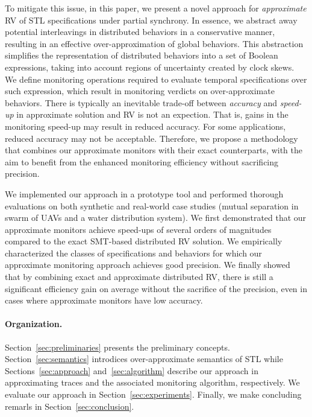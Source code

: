 To mitigate this issue, in this paper, we present a novel approach for \emph{approximate} RV of STL 
specifications under partial synchrony.
%
In essence, we abstract away potential interleavings in distributed behaviors in a conservative 
manner, resulting in an effective over-approximation of global behaviors.
%
This abstraction simplifies the representation of distributed behaviors into a set of Boolean 
expressions, taking into account regions of uncertainty created by clock skews.
%
We define monitoring operations required to evaluate temporal specifications over such expression, 
which result in monitoring verdicts on over-approximate behaviors.
%
There is typically an inevitable trade-off between {\em accuracy} and {\em speed-up} in approximate 
solution and  RV is not an expection.
%
That is, gains in the monitoring speed-up may result in reduced accuracy.
%
For some applications, reduced accuracy may not be acceptable.
%
Therefore, we propose a methodology that combines our approximate monitors with their exact 
counterparts, with the aim to benefit from the enhanced monitoring efficiency without sacrificing 
precision.



We implemented our approach in a prototype tool and performed thorough evaluations on both 
synthetic and real-world case studies (mutual separation in swarm of UAVs and a water distribution 
system).
%
We first demonstrated that our approximate monitors achieve speed-ups of several orders of 
magnitudes compared to the exact SMT-based distributed RV solution.
%
We empirically characterized the classes of specifications and behaviors for which our approximate 
monitoring approach achieves good precision.
%
We finally showed that by combining exact and approximate distributed RV, there is still a 
significant efficiency gain on average without the sacrifice of the precision, even in cases where 
approximate monitors have low accuracy. 

\paragraph{Organization.}
Section~\ref{sec:preliminaries} presents the preliminary concepts.
%
Section~\ref{sec:semantics} introdices over-approximate semantics of STL while 
Sections~\ref{sec:approach} and~\ref{sec:algorithm} describe our approach in approximating traces 
and the associated monitoring algorithm, respectively.
%
We evaluate our approach in Section~\ref{sec:experiments}. Finally, we make concluding remarls in 
Section~\ref{sec:conclusion}.